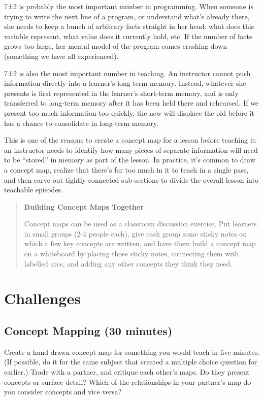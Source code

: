 \documentclass[10pt,statementpaper]{memoir}
\begin{document}
7±2 is probably the most important number in programming. When someone
is trying to write the next line of a program, or understand what's
already there, she needs to keep a bunch of arbitrary facts straight in
her head: what does this variable represent, what value does it
currently hold, etc. If the number of facts grows too large, her mental
model of the program comes crashing down (something we have all
experienced).

7±2 is also the most important number in teaching. An instructor cannot
push information directly into a learner's long-term memory. Instead,
whatever she presents is first represented in the learner's short-term
memory, and is only transferred to long-term memory after it has been
held there and rehearsed. If we present too much information too
quickly, the new will displace the old before it has a chance to
consolidate in long-term memory.

This is one of the reasons to create a concept map for a lesson before
teaching it: an instructor needs to identify how many pieces of separate
information will need to be ``stored'' in memory as part of the lesson.
In practice, it's common to draw a concept map, realize that there's far
too much in it to teach in a single pass, and then carve out
tightly-connected sub-sections to divide the overall lesson into
teachable episodes.

\begin{quote}
\textbf{Building Concept Maps Together}

Concept maps can be used as a classroom discussion exercise. Put
learners in small groups (2-4 people each), give each group some sticky
notes on which a few key concepts are written, and have them build a
concept map on a whiteboard by placing those sticky notes, connecting
them with labelled arcs, and adding any other concepts they think they
need.
\end{quote}

\section{Challenges}\label{challenges-3}

\subsection*{Concept Mapping (30
minutes)}\label{concept-mapping-30-minutes}

Create a hand drawn concept map for something you would teach in five
minutes. (If possible, do it for the same subject that created a
multiple choice question for earlier.) Trade with a partner, and
critique each other's maps. Do they present concepts or surface detail?
Which of the relationships in your partner's map do you consider
concepts and vice versa?
\end{document}
